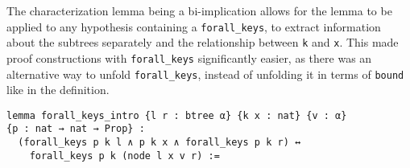 The characterization lemma being a bi-implication allows for the lemma to be applied to any hypothesis containing a \lstinline{forall_keys}, to extract information about the subtrees separately and the relationship between \lstinline{k} and \lstinline{x}. This made proof constructions with \lstinline{forall_keys} significantly easier, as there was an alternative way to unfold \lstinline{forall_keys}, instead of unfolding it in terms of \lstinline{bound} like in the definition. 

\begin{lstlisting}
lemma forall_keys_intro {l r : btree α} {k x : nat} {v : α} 
{p : nat → nat → Prop} :
  (forall_keys p k l ∧ p k x ∧ forall_keys p k r) ↔ 
    forall_keys p k (node l x v r) :=
\end{lstlisting}